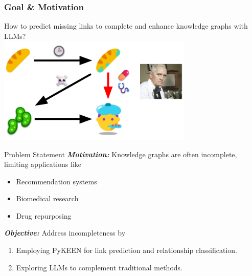 \documentclass{beamer}
\begin{document}
\begin{frame}
    \frametitle{Goal \& Motivation}
    \centering
    How to predict missing links to complete and enhance knowledge graphs with LLMs? \\[2em]
    \includegraphics[width=0.7\textwidth]{images/motivation} \\
\end{frame}

\begin{frame}{Problem Statement}
    \textbf{\textit{Motivation:}} Knowledge graphs are often incomplete, limiting applications like
    \begin{itemize}
        \item Recommendation systems
        \item Biomedical research
        \item Drug repurposing
    \end{itemize}
    \textbf{\textit{Objective:}} Address incompleteness by
    \begin{enumerate}
        \item Employing PyKEEN for link prediction and relationship classification.
        \item Exploring LLMs to complement traditional methods.
    \end{enumerate}
\end{frame}
\end{document}
